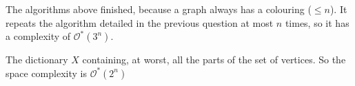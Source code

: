 \documentclass{article}
\theoremstyle{plain}
\begin{document}
\begin{enumerate}
\begin{enumerate}
          The algorithms above finished, because a graph always has a colouring
          ($\leq n$). It repeats the algorithm detailed in the previous question
          at most $n$ times, so it has a complexity of $\mathcal O^*(3^n)$.

          The dictionary $X$ containing, at worst, all the parts of the set of
          vertices. So the space complexity is $\mathcal O^*(2^n)$
      \end{enumerate}
  \end{enumerate}
\end{document}
